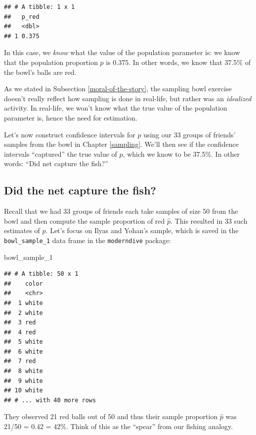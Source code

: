 \documentclass[
]{book}
\newenvironment{Shaded}{\begin{snugshade}}{\end{snugshade}}
\newcommand{\DecValTok}[1]{\textcolor[rgb]{0.00,0.00,0.81}{#1}}
\newcommand{\NormalTok}[1]{#1}
\begin{document}
\begin{verbatim}
## # A tibble: 1 x 1
##   p_red
##   <dbl>
## 1 0.375
\end{verbatim}

In this case, we \emph{know} what the value of the population parameter is: we know that the population proportion \(p\) is 0.375. In other words, we know that 37.5\% of the bowl's balls are red.

As we stated in Subsection \ref{moral-of-the-story}, the sampling bowl exercise doesn't really reflect how sampling is done in real-life, but rather was an \emph{idealized} activity. In real-life, we won't know what the true value of the population parameter is, hence the need for estimation.

Let's now construct confidence intervals for \(p\) using our 33 groups of friends' samples from the bowl in Chapter \ref{sampling}. We'll then see if the confidence intervals ``captured'' the true value of \(p\), which we know to be 37.5\%. In other words: ``Did net capture the fish?''

\hypertarget{ilyas-yohan}{%
\subsection{Did the net capture the fish?}\label{ilyas-yohan}}

Recall that we had 33 groups of friends each take samples of size 50 from the bowl and then compute the sample proportion of red \(\widehat{p}\). This resulted in 33 such estimates of \(p\). Let's focus on Ilyas and Yohan's sample, which is saved in the \texttt{bowl\_sample\_1} data frame in the \texttt{moderndive} package:

\begin{Shaded}
\begin{Highlighting}[]
\NormalTok{bowl_sample_}\DecValTok{1}
\end{Highlighting}
\end{Shaded}

\begin{verbatim}
## # A tibble: 50 x 1
##    color
##    <chr>
##  1 white
##  2 white
##  3 red  
##  4 red  
##  5 white
##  6 white
##  7 red  
##  8 white
##  9 white
## 10 white
## # ... with 40 more rows
\end{verbatim}

They observed 21 red balls out of 50 and thus their sample proportion \(\widehat{p}\) was 21/50 = 0.42 = 42\%. Think of this as the ``spear'' from our fishing analogy.
\end{document}
